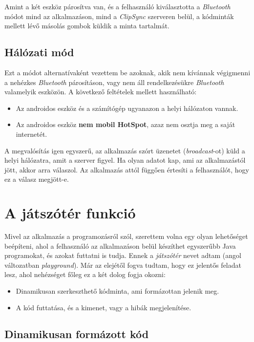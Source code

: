 \documentclass[12pt,a4paper]{article}
\begin{document}
	Amint a két eszköz párosítva van, és a felhasználó kiválasztotta a \textit{Bluetooth} módot mind az alkalmazáson, mind a \textit{ClipSync} szerveren belül, a kódminták mellett lévő másolás gombok küldik a minta tartalmát.
	
	\subsection{Hálózati mód}
	
	Ezt a módot alternatívaként vezettem be azoknak, akik nem kívánnak végigmenni a nehézkes \textit{Bluetooth} párosításon, vagy nem áll rendelkezésükre \textit{Bluetooth} valamelyik eszközön. A következő feltételek mellett használható:
	
	\begin{itemize}
		\item Az androidos eszköz és a számítógép ugyanazon a helyi hálózaton vannak.
		\item Az androidos eszköz \textbf{nem mobil HotSpot}, azaz nem osztja meg a saját internetét.
	\end{itemize}

	A megvalósítás igen egyszerű, az alkalmazás szórt üzenetet (\textit{broadcast}-ot) küld a helyi hálózatra, amit a szerver figyel. Ha olyan adatot kap, ami az alkalmazástól jött, akkor arra válaszol. Az alkalmazás attól függően értesíti a felhasználót, hogy ez a válasz megjött-e.  
	
	\section{A játszótér funkció}\label{playground}

	Mivel az alkalmazás a programozásról szól, szerettem volna egy olyan lehetőséget beépíteni, ahol a felhasználó az alkalmazáson belül készíthet egyszerűbb Java programokat, és azokat futtatni is tudja. Ennek a \textit{játszótér} nevet adtam (angol változatban \textit{playground}). Már az elejétől fogva tudtam, hogy ez jelentős feladat lesz, ahol nehézséget főleg ez a két dolog fogja okozni:
	
	\begin{itemize}
		\item Dinamikusan szerkeszthető kódminta, ami formázottan jelenik meg.
		\item A kód futtatása, és a kimenet, vagy a hibák megjelenítése.
	\end{itemize}

	\subsection{Dinamikusan formázott kód}\label{dinamikusan_formazott_kod}
	
\end{document}
